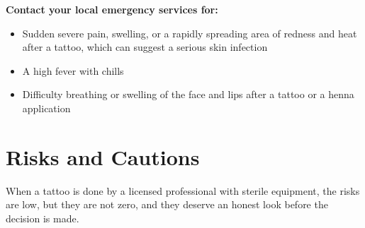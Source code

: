 \textbf{Contact your local emergency services for:}
\begin{itemize}
    \item Sudden severe pain, swelling, or a rapidly spreading area of redness and heat after a tattoo, which can suggest a serious skin infection
    \item A high fever with chills
    \item Difficulty breathing or swelling of the face and lips after a tattoo or a henna application
\end{itemize}

\section*{Risks and Cautions}
When a tattoo is done by a licensed professional with sterile equipment, the risks are low, but they are not zero, and they deserve an honest look before the decision is made.

